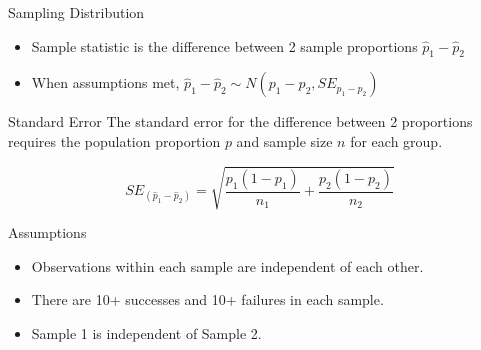 \documentclass[
  ignorenonframetext,
]{beamer}
\providecommand{\tightlist}{%
  \setlength{\itemsep}{0pt}\setlength{\parskip}{0pt}}\usepackage{longtable,booktabs,array}
\begin{document}
\begin{frame}{Sampling Distribution}
\label{sampling-distribution}
\begin{itemize}
\tightlist
\item
  Sample statistic is the difference between 2 sample proportions
  \(\hat{p}_1 - \hat{p}_2\)
\end{itemize}

\pause

\begin{itemize}
\tightlist
\item
  When assumptions met,
  \(\hat{p}_1-\hat{p}_2 \sim N(p_1-p_2, SE_{p_1-p_2})\)
\end{itemize}
\end{frame}

\begin{frame}{Standard Error}
\label{standard-error-1}
The standard error for the difference between 2 proportions requires the
population proportion \(p\) and sample size \(n\) for each group.

\[
SE_{(\hat{p}_1-\hat{p}_2)}=\sqrt{\frac{p_1(1-p_1)}{n_1}+\frac{p_2(1-p_2)}{n_2}}
\]
\end{frame}

\begin{frame}{Assumptions}
\label{assumptions}
\begin{itemize}
\tightlist
\item
  Observations within each sample are independent of each other.
\end{itemize}

\pause

\begin{itemize}
\tightlist
\item
  There are 10+ successes and 10+ failures in each sample.
\end{itemize}

\pause

\begin{itemize}
\tightlist
\item
  Sample 1 is independent of Sample 2.
\end{itemize}
\end{frame}
\end{document}
